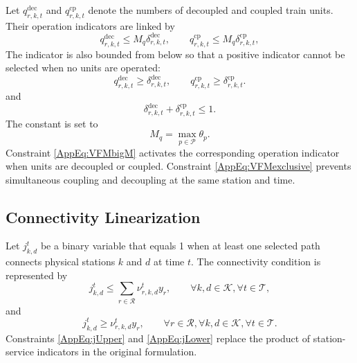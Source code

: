 \documentclass[11pt]{article}
\begin{document}
Let $q_{r,k,t}^{\mathrm{dec}}$ and $q_{r,k,t}^{\mathrm{cp}}$ denote the numbers of decoupled and coupled train units. Their operation indicators are linked by
\begin{equation}
q_{r,k,t}^{\mathrm{dec}}
\leq
M_q \delta_{r,k,t}^{\mathrm{dec}},
\qquad
q_{r,k,t}^{\mathrm{cp}}
\leq
M_q \delta_{r,k,t}^{\mathrm{cp}},
\label{AppEq:VFMbigM}
\end{equation}
The indicator is also bounded from below so that a positive indicator cannot be selected when no units are operated:
\begin{equation}
q_{r,k,t}^{\mathrm{dec}} \geq \delta_{r,k,t}^{\mathrm{dec}},
\qquad
q_{r,k,t}^{\mathrm{cp}} \geq \delta_{r,k,t}^{\mathrm{cp}}.
\label{AppEq:VFMlower}
\end{equation}
and
\begin{equation}
\delta_{r,k,t}^{\mathrm{dec}}
+
\delta_{r,k,t}^{\mathrm{cp}}
\leq 1.
\label{AppEq:VFMexclusive}
\end{equation}
The constant is set to
\begin{equation}
M_q=\max_{p\in\mathcal{P}}\theta_p.
\label{AppEq:Mq}
\end{equation}
Constraint \eqref{AppEq:VFMbigM} activates the corresponding operation indicator when units are decoupled or coupled. Constraint \eqref{AppEq:VFMexclusive} prevents simultaneous coupling and decoupling at the same station and time.

\subsection{Connectivity Linearization}
\label{App:Connectivity}

Let $j_{k,d}^{t}$ be a binary variable that equals 1 when at least one selected path connects physical stations $k$ and $d$ at time $t$. The connectivity condition is represented by
\begin{equation}
j_{k,d}^{t}
\leq
\sum_{r\in\mathcal{R}}
\nu_{r,k,d}^{t} y_r,
\qquad
\forall k,d\in\mathcal{K},
\forall t\in\mathcal{T},
\label{AppEq:jUpper}
\end{equation}
and
\begin{equation}
j_{k,d}^{t}
\geq
\nu_{r,k,d}^{t} y_r,
\qquad
\forall r\in\mathcal{R},
\forall k,d\in\mathcal{K},
\forall t\in\mathcal{T}.
\label{AppEq:jLower}
\end{equation}
Constraints \eqref{AppEq:jUpper} and \eqref{AppEq:jLower} replace the product of station-service indicators in the original formulation.
\end{document}
